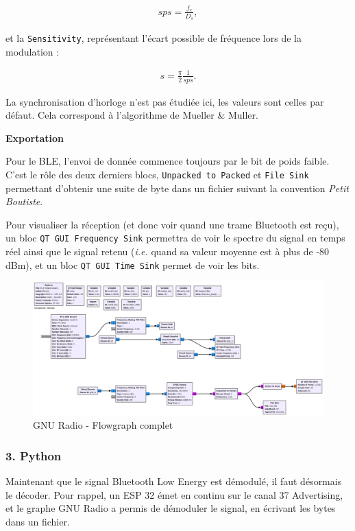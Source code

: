 \[\begin{aligned}
sps = \frac{f_e}{D_s},
\end{aligned}\]

et la \texttt{Sensitivity}, représentant l'écart possible de fréquence
lors de la modulation :

\[\begin{aligned}
s = \frac{\pi}{2} \frac{1}{sps}.
\end{aligned}\]

La synchronisation d'horloge n'est pas étudiée ici, les valeurs sont
celles par défaut. Cela correspond à l'algorithme de Mueller \& Muller.

\textbf{Exportation}

Pour le BLE, l'envoi de donnée commence toujours par le bit de poids
faible. C'est le rôle des deux derniers blocs,
\texttt{Unpacked\ to\ Packed} et \texttt{File\ Sink} permettant
d'obtenir une suite de byte dans un fichier suivant la convention
\emph{Petit Boutiste}.

Pour visualiser la réception (et donc voir quand une trame Bluetooth est
reçu), un bloc \texttt{QT\ GUI\ Frequency\ Sink} permettra de voir le
spectre du signal en temps réel ainsi que le signal retenu (\emph{i.e.}
quand sa valeur moyenne est à plus de -80 dBm), et un bloc
\texttt{QT\ GUI\ Time\ Sink} permet de voir les bits.

\begin{figure}
\centering
\includegraphics{static/ble-flowgraph.png}
\caption{GNU Radio - Flowgraph complet}
\end{figure}

\subsubsection{3. Python}\label{python}

Maintenant que le signal Bluetooth Low Energy est démodulé, il faut
désormais le décoder. Pour rappel, un ESP 32 émet en continu sur le
canal 37 Advertising, et le graphe GNU Radio a permis de démoduler le
signal, en écrivant les bytes dans un fichier.

